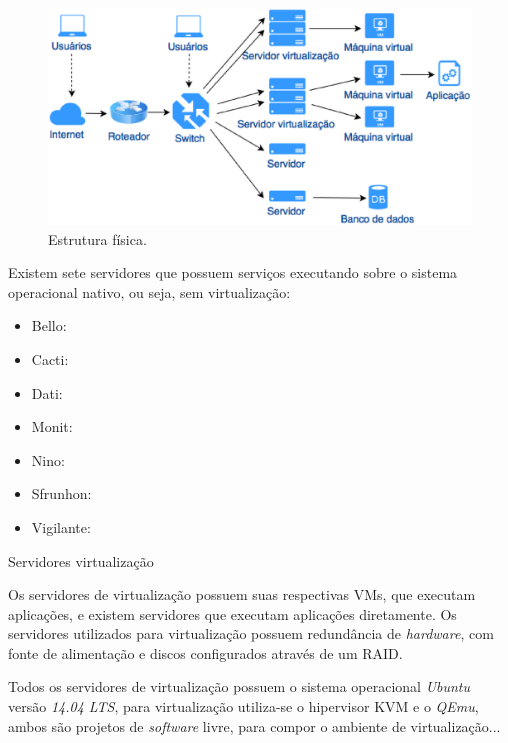 \begin{figure}[h!]
 \centering
 \includegraphics[width=430px]{img/servfisicos.eps}
 \caption{Estrutura física.}
 \label{fig:servfisicos}
\end{figure}

Existem sete servidores que possuem serviços executando sobre o sistema operacional nativo, ou seja, sem virtualização:
\begin{itemize}
 \item Bello: 
 \item Cacti: 
 \item Dati: 
 \item Monit: 
 \item Nino: 
 \item Sfrunhon: 
 \item Vigilante: 
\end{itemize}

Servidores virtualização

Os servidores de virtualização possuem suas 
respectivas \ac{VM}s, que executam aplicações, e existem servidores que executam aplicações diretamente.
Os servidores utilizados para virtualização possuem redundância de \textit{hardware}, com fonte de alimentação e discos configurados através 
de um \ac{RAID}.

Todos os servidores de virtualização possuem o sistema operacional \textit{Ubuntu} versão \textit{14.04 LTS}, para virtualização utiliza-se o 
hipervisor \ac{KVM} e o \textit{QEmu}, ambos são projetos de \textit{software} livre, para compor o ambiente de virtualização...


